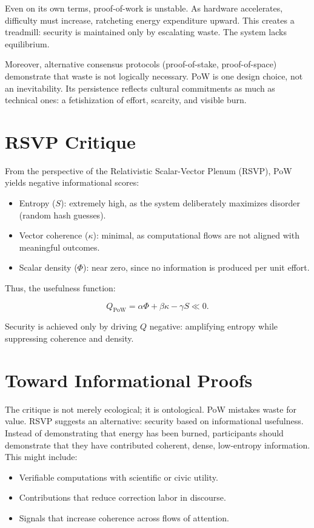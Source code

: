 \documentclass[openany]{book}
\begin{document}
Even on its own terms, proof-of-work is unstable. As hardware accelerates, difficulty must increase, ratcheting energy expenditure upward. This creates a treadmill: security is maintained only by escalating waste. The system lacks equilibrium.

Moreover, alternative consensus protocols (proof-of-stake, proof-of-space) demonstrate that waste is not logically necessary. PoW is one design choice, not an inevitability. Its persistence reflects cultural commitments as much as technical ones: a fetishization of effort, scarcity, and visible burn.

\section{RSVP Critique}

From the perspective of the Relativistic Scalar-Vector Plenum (RSVP), PoW yields negative informational scores:

\begin{itemize}
    \item Entropy ($S$): extremely high, as the system deliberately maximizes disorder (random hash guesses).
    \item Vector coherence ($\kappa$): minimal, as computational flows are not aligned with meaningful outcomes.
    \item Scalar density ($\Phi$): near zero, since no information is produced per unit effort.
\end{itemize}

Thus, the usefulness function:

\[ Q_{\text{PoW}} = \alpha \Phi + \beta \kappa - \gamma S \ll 0. \]

Security is achieved only by driving $Q$ negative: amplifying entropy while suppressing coherence and density.

\section{Toward Informational Proofs}

The critique is not merely ecological; it is ontological. PoW mistakes waste for value. RSVP suggests an alternative: security based on informational usefulness. Instead of demonstrating that energy has been burned, participants should demonstrate that they have contributed coherent, dense, low-entropy information. This might include:

\begin{itemize}
    \item Verifiable computations with scientific or civic utility.
    \item Contributions that reduce correction labor in discourse.
    \item Signals that increase coherence across flows of attention.
\end{itemize}
\end{document}

